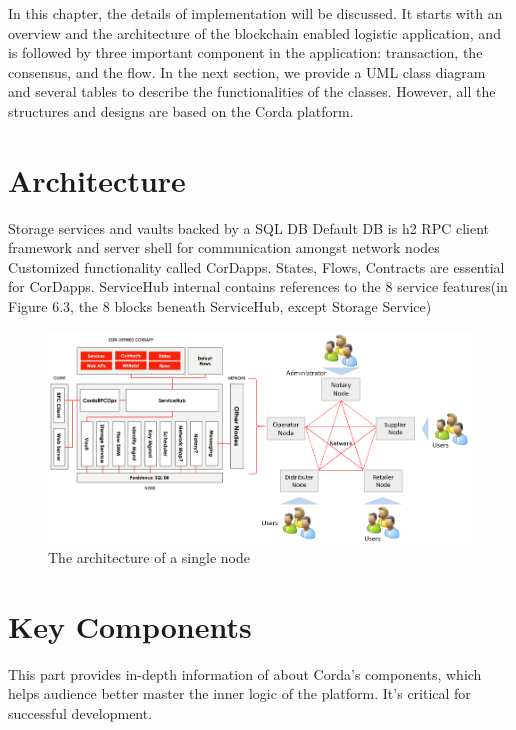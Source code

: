 In this chapter, the details of implementation will be discussed. It starts with an overview and the architecture of the blockchain enabled logistic application, and is followed by three important component in the application: transaction, the consensus, and the flow. In the next section, we provide a UML class diagram and several tables to describe the functionalities of the classes. However, all the structures and designs are based on the Corda platform. 

\section{Architecture}


\begin{outline}
	\1 Storage services and vaults backed by a SQL DB
	  \2 Default DB is h2  
	\1 RPC client framework and server shell for communication amongst network nodes
	\1 Customized functionality called CorDapps.
	   \2 States, Flows, Contracts are essential for CorDapps.
	\1 ServiceHub internal contains references to the 8 service features(in Figure 6.3, the 8 blocks beneath ServiceHub, except Storage Service)
\end{outline}

\begin{figure}[!htb]%
	\includegraphics[width=\textwidth]{charts/node-architecture}
	\caption{The architecture of a single node}
\end{figure}

\section{Key Components}
This part provides in-depth information of about Corda's components, which helps audience better master the inner logic of the platform. It's critical for successful development.

